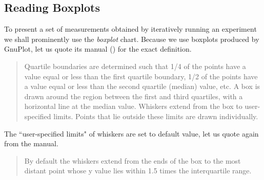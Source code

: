 \subsection{Reading Boxplots}

To present a set of measurements obtained by iteratively running an experiment we shall prominently use the \textit{boxplot} chart. Because we use boxplots produced by GnuPlot, let us quote its manual (\cite{gnuplot-manual}) for the exact definition.

\begin{quote}
Quartile boundaries are determined such that 1/4 of the points have a value equal or less than the first quartile boundary, 1/2 of the points have a value equal or less than the second quartile (median) value, etc. A box is drawn around the region between the first and third quartiles, with a horizontal line at the median value. Whiskers extend from the box to user-specified limits. Points that lie outside these limits are drawn individually.
\end{quote}

The ``user-specified limits" of whiskers are set to default value, let us quote again from the manual.

\begin{quote}
By default the whiskers extend from the ends of the box to the most distant point whose y value lies within 1.5 times the interquartile range.
\end{quote}